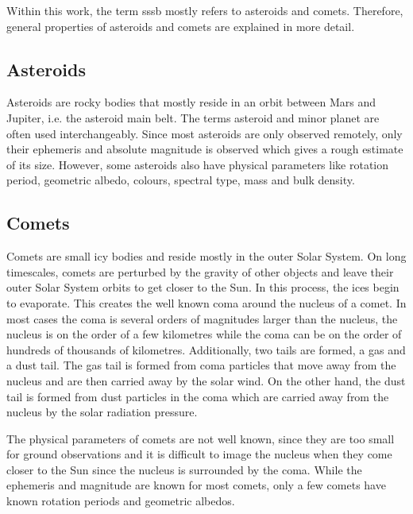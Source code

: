 Within this work, the term \gls{sssb} mostly refers to asteroids and comets. Therefore, general properties of asteroids and comets are explained in more detail.

\subsection{Asteroids}
Asteroids are rocky bodies that mostly reside in an orbit between Mars and Jupiter, i.e. the asteroid main belt. The terms asteroid and minor planet are often used interchangeably. Since most asteroids are only observed remotely, only their ephemeris and absolute magnitude is observed which gives a rough estimate of its size. However, some asteroids also have physical parameters like rotation period, geometric albedo, colours, spectral type, mass and bulk density.

\subsection{Comets}
Comets are small icy bodies and reside mostly in the outer Solar System. On long timescales, comets are perturbed by the gravity of other objects and leave their outer Solar System orbits to get closer to the Sun. In this process, the ices begin to evaporate. This creates the well known coma around the nucleus of a comet. In most cases the coma is several orders of magnitudes larger than the nucleus, the nucleus is on the order of a few kilometres while the coma can be on the order of hundreds of thousands of kilometres. Additionally, two tails are formed, a gas and a dust tail. The gas tail is formed from coma particles that move away from the nucleus and are then carried away by the solar wind. On the other hand, the dust tail is formed from dust particles in the coma which are carried away from the nucleus by the solar radiation pressure.

The physical parameters of comets are not well known, since they are too small for ground observations and it is difficult to image the nucleus when they come closer to the Sun since the nucleus is surrounded by the coma. While the ephemeris and magnitude are known for most comets, only a few comets have known rotation periods and geometric albedos.

